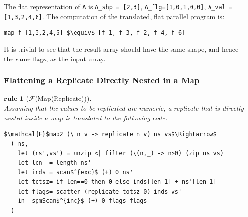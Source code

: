 \documentclass[acmsmall,review]{acmart}\settopmatter{printfolios=true,printccs=false,printacmref=false}
\newtheorem{rewrite}{rule}
\begin{document}
The flat representation of {\tt A} is {\tt A\_shp = [2,3]}, 
{\tt A\_flg=[1,0,1,0,0]}, {\tt A\_val = [1,3,2,4,6]}. 
The computation of the translated, flat parallel program is:
\begin{lstlisting}[mathescape=true]
map f [1,3,2,4,6] $\equiv$ [f 1, f 3, f 2, f 4, f 6]
\end{lstlisting}\vspace{-2ex}
It is trivial to see that the result array should have the same shape, 
and hence the same flags, as the input array.

\newpage
\subsubsection{Flattening a Replicate Directly Nested in a Map}
\label{subsubsec:rep-in-map} 

\begin{rewrite}[$\mathcal{F}$(Map(Replicate))]\label{Flat-Rep-In-Map}
$\mbox{ }$\\
Assuming that the values to be replicated are numeric, a replicate that 
is directly nested inside a map is translated to the following code:
\begin{lstlisting}[mathescape=true]
$\mathcal{F}$map2 (\ n v -> replicate n v) ns vs$\Rightarrow$
  ( ns,
    let (ns',vs') = unzip <| filter (\(n,_) -> n>0) (zip ns vs)
    let len  = length ns'
    let inds = scan$^{exc}$ (+) 0 ns'
    let totsz= if len==0 then 0 else inds[len-1] + ns'[len-1]
    let flags= scatter (replicate totsz 0) inds vs'
    in  sgmScan$^{inc}$ (+) 0 flags flags
  )
\end{lstlisting}\vspace{-2ex}
\end{rewrite}
\end{document}
